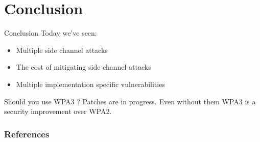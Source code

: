\documentclass[xcolor=table]{bredelebeamer}
\begin{document}
\section{Conclusion}
\begin{frame}{Conclusion}
    Today we've seen:

\begin{itemize}
    \item Multiple side channel attacks
    \item The cost of mitigating side channel attacks
    \item Multiple implementation specific vulnerabilities
\end{itemize}
\vspace{30pt}
\begin{exampleblock}{Should you use WPA3 ?}
Patches are in progress. Even without them WPA3 is a security improvement over WPA2.
\end{exampleblock}
\end{frame}
\begin{frame}[allowframebreaks]
        \frametitle{References}
        \printbibliography
\end{frame}
\end{document}
